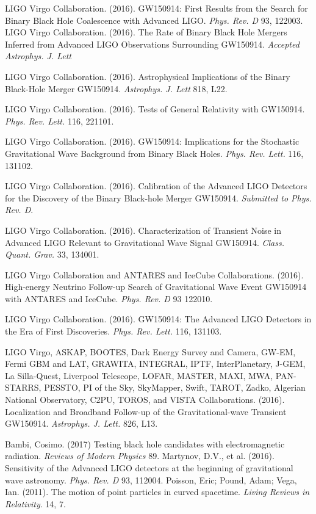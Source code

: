   LIGO Virgo Collaboration. (2016). GW150914: First Results from the Search for Binary Black Hole Coalescence with Advanced LIGO. {\em Phys. Rev. D} 93, 122003.
  LIGO Virgo Collaboration. (2016). The Rate of Binary Black Hole Mergers Inferred from Advanced LIGO Observations Surrounding GW150914. {\em Accepted Astrophys. J. Lett}

  LIGO Virgo Collaboration. (2016). Astrophysical Implications of the Binary Black-Hole Merger GW150914. {\em Astrophys. J. Lett} 818, L22.

  LIGO Virgo Collaboration. (2016). Tests of General Relativity with GW150914. {\em Phys. Rev. Lett.} 116, 221101.
  
  LIGO Virgo Collaboration. (2016). GW150914: Implications for the Stochastic Gravitational Wave Background from Binary Black Holes. {\em Phys. Rev. Lett.} 116, 131102.

  LIGO Virgo Collaboration. (2016). Calibration of the Advanced LIGO Detectors for the Discovery of the Binary Black-hole Merger GW150914. {\em Submitted to Phys. Rev. D}.

  LIGO Virgo Collaboration. (2016). Characterization of Transient Noise in Advanced LIGO Relevant to Gravitational Wave Signal GW150914. {\em Class. Quant. Grav.} 33, 134001.

  LIGO Virgo Collaboration and ANTARES and IceCube Collaborations. (2016). High-energy Neutrino Follow-up Search of Gravitational Wave Event GW150914 with ANTARES and IceCube. {\em Phys. Rev. D} 93 122010. 

  LIGO Virgo Collaboration. (2016). GW150914: The Advanced LIGO Detectors in the Era of First Discoveries. {\em Phys. Rev. Lett.} 116, 131103.

  LIGO Virgo, ASKAP, BOOTES, Dark Energy Survey and Camera, GW-EM, Fermi GBM and LAT, GRAWITA, INTEGRAL, IPTF, InterPlanetary, J-GEM, La Silla-Quest, Liverpool Telescope, LOFAR, MASTER, MAXI, MWA, PAN-STARRS, PESSTO, PI of the Sky, SkyMapper, Swift, TAROT, Zadko, Algerian National Observatory, C2PU, TOROS, and VISTA Collaborations. (2016). Localization and Broadband Follow-up of the Gravitational-wave Transient GW150914. {\em Astrophys. J. Lett.} 826, L13.
  
  Bambi, Cosimo. (2017) Testing black hole candidates with electromagnetic radiation. {\em Reviews of Modern Physics} 89.
  Martynov, D.V., et al. (2016). Sensitivity of the Advanced LIGO detectors at the beginning of gravitational wave astronomy. {\em Phys. Rev. D} 93, 112004.
  Poisson, Eric; Pound, Adam; Vega, Ian. (2011). The motion of point particles in curved spacetime. {\em Living Reviews in Relativity}. 14, 7. 

